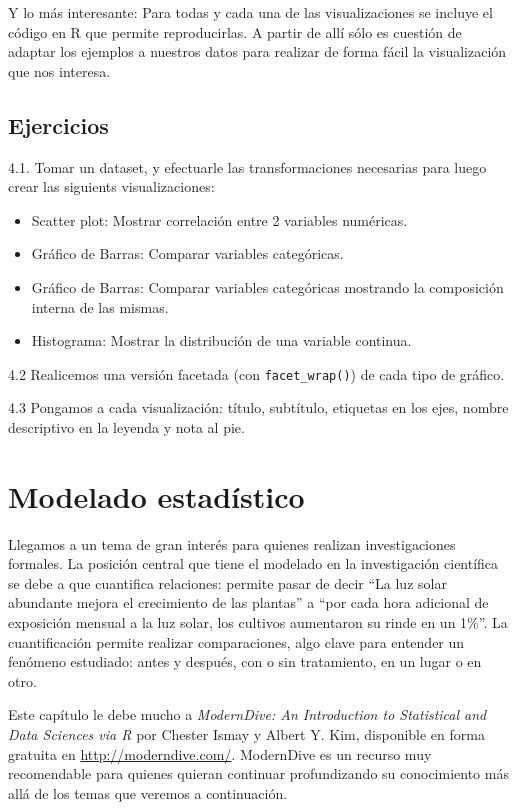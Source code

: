 \documentclass[spanish,]{book}
\providecommand{\tightlist}{%
  \setlength{\itemsep}{0pt}\setlength{\parskip}{0pt}}
\begin{document}
Y lo más interesante: Para todas y cada una de las visualizaciones se incluye el código en R que permite reproducirlas. A partir de allí sólo es cuestión de adaptar los ejemplos a nuestros datos para realizar de forma fácil la visualización que nos interesa.

\hypertarget{ejercicios-2}{%
\section{Ejercicios}\label{ejercicios-2}}

4.1. Tomar un dataset, y efectuarle las transformaciones necesarias para luego crear las siguients visualizaciones:

\begin{itemize}
\tightlist
\item
  Scatter plot: Mostrar correlación entre 2 variables numéricas.
\item
  Gráfico de Barras: Comparar variables categóricas.
\item
  Gráfico de Barras: Comparar variables categóricas mostrando la composición interna de las mismas.\\
\item
  Histograma: Mostrar la distribución de una variable continua.
\end{itemize}

4.2 Realicemos una versión facetada (con \texttt{facet\_wrap()}) de cada tipo de gráfico.

4.3 Pongamos a cada visualización: título, subtítulo, etiquetas en los ejes, nombre descriptivo en la leyenda y nota al pie.

\hypertarget{modelado-estaduxedstico}{%
\chapter{Modelado estadístico}\label{modelado-estaduxedstico}}

Llegamos a un tema de gran interés para quienes realizan investigaciones formales. La posición central que tiene el modelado en la investigación científica se debe a que cuantifica relaciones: permite pasar de decir ``La luz solar abundante mejora el crecimiento de las plantas'' a ``por cada hora adicional de exposición mensual a la luz solar, los cultivos aumentaron su rinde en un 1\%''. La cuantificación permite realizar comparaciones, algo clave para entender un fenómeno estudiado: antes y después, con o sin tratamiento, en un lugar o en otro.

Este capítulo le debe mucho a \emph{ModernDive: An Introduction to Statistical and Data Sciences via R} por Chester Ismay y Albert Y. Kim, disponible en forma gratuita en \url{http://moderndive.com/}. ModernDive es un recurso muy recomendable para quienes quieran continuar profundizando su conocimiento más allá de los temas que veremos a continuación.
\end{document}
